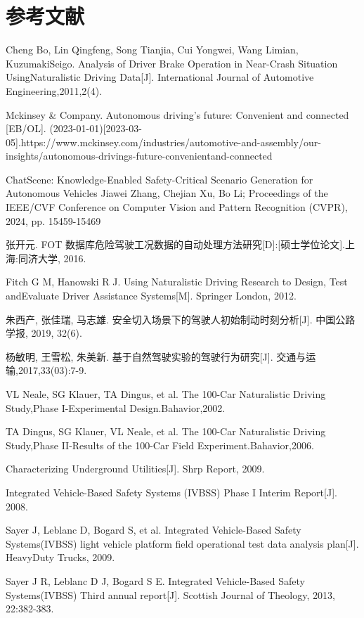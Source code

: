 \section{参考文献}

Cheng Bo, Lin Qingfeng, Song Tianjia, Cui Yongwei, Wang Limian, KuzumakiSeigo. Analysis of Driver Brake Operation in Near-Crash Situation UsingNaturalistic Driving Data[J]. International Journal of Automotive Engineering,2011,2(4).


Mckinsey \& Company. Autonomous driving’s future: Convenient and connected [EB/OL]. (2023-01-01)[2023-03-05].https://www.mckinsey.com/industries/automotive-and-assembly/our-insights/autonomous-drivings-future-convenientand-connected


ChatScene: Knowledge-Enabled Safety-Critical Scenario Generation for Autonomous Vehicles
Jiawei Zhang, Chejian Xu, Bo Li; Proceedings of the IEEE/CVF Conference on Computer Vision and Pattern Recognition (CVPR), 2024, pp. 15459-15469


张开元. FOT 数据库危险驾驶工况数据的自动处理方法研究[D]:[硕士学位论文].上海:同济大学, 2016.


Fitch G M, Hanowski R J. Using Naturalistic Driving Research to Design, Test andEvaluate Driver Assistance Systems[M]. Springer London, 2012.

朱西产, 张佳瑞, 马志雄. 安全切入场景下的驾驶人初始制动时刻分析[J]. 中国公路学报, 2019, 32(6).

杨敏明, 王雪松, 朱美新. 基于自然驾驶实验的驾驶行为研究[J]. 交通与运输,2017,33(03):7-9.

VL Neale, SG Klauer, TA Dingus, et al. The 100-Car Naturalistic Driving Study,Phase I-Experimental Design.Bahavior,2002.

TA Dingus, SG Klauer, VL Neale, et al. The 100-Car Naturalistic Driving Study,Phase II-Results of the 100-Car Field Experiment.Bahavior,2006.

Characterizing Underground Utilities[J]. Shrp Report, 2009.

Integrated Vehicle-Based Safety Systems (IVBSS) Phase I Interim Report[J]. 2008.

Sayer J, Leblanc D, Bogard S, et al. Integrated Vehicle-Based Safety Systems(IVBSS) light vehicle platform field operational test data analysis plan[J]. HeavyDuty Trucks, 2009.

Sayer J R, Leblanc D J, Bogard S E. Integrated Vehicle-Based Safety Systems(IVBSS) Third annual report[J]. Scottish Journal of Theology, 2013, 22:382-383.


